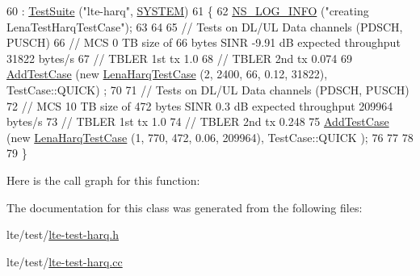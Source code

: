 \begin{DoxyCode}
60   : \hyperlink{classns3_1_1TestSuite_a904b0c40583b744d30908aeb94636d1a}{TestSuite} (\textcolor{stringliteral}{"lte-harq"}, \hyperlink{classns3_1_1TestSuite_a1ebfcab34ec8161e085e8e3a1855eae0a90c5529a26ab3a5ffcc6e57040dbd82e}{SYSTEM})
61 \{
62   \hyperlink{group__logging_gafbd73ee2cf9f26b319f49086d8e860fb}{NS\_LOG\_INFO} (\textcolor{stringliteral}{"creating LenaTestHarqTestCase"});
63 
64 
65   \textcolor{comment}{// Tests on DL/UL Data channels (PDSCH, PUSCH)}
66   \textcolor{comment}{// MCS 0 TB size of 66 bytes SINR -9.91 dB expected throughput 31822 bytes/s}
67   \textcolor{comment}{// TBLER 1st tx 1.0}
68   \textcolor{comment}{// TBLER 2nd tx 0.074}
69   \hyperlink{classns3_1_1TestCase_a3718088e3eefd5d6454569d2e0ddd835}{AddTestCase} (\textcolor{keyword}{new} \hyperlink{classLenaHarqTestCase}{LenaHarqTestCase} (2, 2400, 66, 0.12, 31822), TestCase::QUICK)
      ;
70 
71   \textcolor{comment}{// Tests on DL/UL Data channels (PDSCH, PUSCH)}
72   \textcolor{comment}{// MCS 10 TB size of 472 bytes SINR 0.3 dB expected throughput 209964 bytes/s}
73   \textcolor{comment}{// TBLER 1st tx 1.0}
74   \textcolor{comment}{// TBLER 2nd tx 0.248}
75   \hyperlink{classns3_1_1TestCase_a3718088e3eefd5d6454569d2e0ddd835}{AddTestCase} (\textcolor{keyword}{new} \hyperlink{classLenaHarqTestCase}{LenaHarqTestCase} (1, 770, 472, 0.06, 209964), TestCase::QUICK
      );
76 
77 
78 
79 \}
\end{DoxyCode}


Here is the call graph for this function\+:




The documentation for this class was generated from the following files\+:\begin{DoxyCompactItemize}
\item 
lte/test/\hyperlink{lte-test-harq_8h}{lte-\/test-\/harq.\+h}\item 
lte/test/\hyperlink{lte-test-harq_8cc}{lte-\/test-\/harq.\+cc}\end{DoxyCompactItemize}
